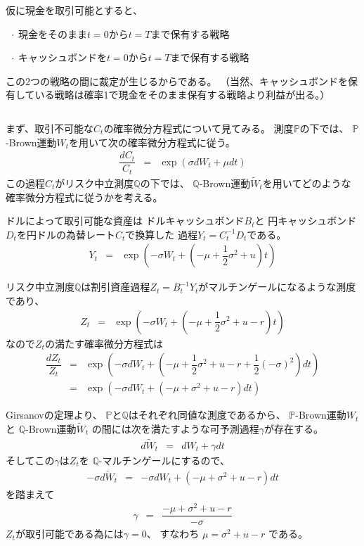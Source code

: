 \documentclass[uplatex,a4j,12pt,dvipdfmx]{jsarticle}
\begin{document}
仮に現金を取引可能とすると、

$ \hspace{2mm} \cdot$
現金をそのまま$t=0$から$t=T$まで保有する戦略

$ \hspace{2mm} \cdot$
キャッシュボンドを$t=0$から$t=T$まで保有する戦略

この2つの戦略の間に裁定が生じるからである。
（当然、キャッシュボンドを保有している戦略は確率1で現金をそのまま保有する戦略より利益が出る。）

${}$

まず、取引不可能な$C_{t}$の確率微分方程式について見てみる。
測度$\mathbb{P}$の下では、
$\mathbb{P}$-Brown運動$W_{t}$を用いて次の確率微分方程式に従う。
%
%
\begin{eqnarray*}
	\dfrac{dC_{t}}{C_{t}}
	&=&
	\exp \left( \sigma dW_{t} + \mu dt \right)
\end{eqnarray*}
%
%
この過程$C_{t}$がリスク中立測度$\mathbb{Q}$の下では、
$\mathbb{Q}$-Brown運動$\tilde{W}_{t}$を用いてどのような
確率微分方程式に従うかを考える。

ドルによって取引可能な資産は
ドルキャッシュボンド$B_{t}$と
円キャッシュボンド$D_{t}$を円ドルの為替レート$C_{t}$で換算した
過程$Y_{t} = C^{-1}_{t}D_{t}$である。
%
%
\begin{eqnarray*}
	Y_{t}
	&=&
	\exp \left( - \sigma W_{t} + \left( - \mu + \dfrac{1}{2} \sigma^{2} + u \right) t \right)
\end{eqnarray*}
%
%

リスク中立測度$\mathbb{Q}$は割引資産過程$Z_{t} = B^{-1}_{t} Y_{t}$がマルチンゲールになるような測度であり、
%
%
\begin{eqnarray*}
	Z_{t}
	&=&
	\exp \left( - \sigma W_{t} + \left( - \mu + \dfrac{1}{2} \sigma^{2} + u - r \right) t \right)
\end{eqnarray*}
%
%
なので$Z_{t}$の満たす確率微分方程式は
%
%
\begin{eqnarray*}
	\dfrac{d Z_{t}}{Z_{t}}
	&=&
	\exp \left( - \sigma d W_{t} + \left( - \mu + \dfrac{1}{2} \sigma^{2} + u - r + \dfrac{1}{2} (-\sigma)^{2} \right) d t \right)
	\\ &=&
	\exp \left( - \sigma d W_{t} + \left( - \mu + \sigma^{2} + u - r \right) d t \right)
\end{eqnarray*}
%
%

Girsanovの定理より、
$\mathbb{P}$と$\mathbb{Q}$はそれぞれ同値な測度であるから、
$\mathbb{P}$-Brown運動$W_{t}$と
$\mathbb{Q}$-Brown運動$\tilde{W}_{t}$
の間には次を満たすような可予測過程$\gamma$が存在する。
%
%
\begin{eqnarray*}
	d \tilde{W}_{t}
	&=&
	d W_{t} + \gamma dt
\end{eqnarray*}
%
%
そしてこの$\gamma$は$Z_{t}$を
$\mathbb{Q}$-マルチンゲールにするので、
%
%
\begin{eqnarray*}
	- \sigma d \tilde{W}_{t}
	&=&
	- \sigma d W_{t} + \left( - \mu + \sigma^{2} + u - r \right) d t
\end{eqnarray*}
%
%
を踏まえて
%
%
\begin{eqnarray*}
	\gamma
	&=&
	\dfrac{- \mu + \sigma^{2} + u - r}{ - \sigma}
\end{eqnarray*}
%
%
$Z_{t}$が取引可能である為には$\gamma = 0$、
すなわち
$\mu = \sigma^{2} + u - r$
である。
\end{document}
